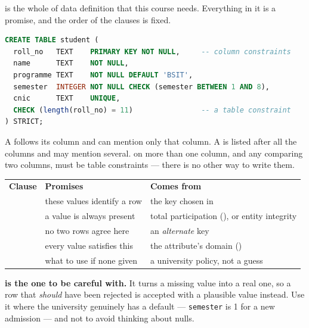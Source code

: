  is the whole of data definition that this course needs.
Everything in it is a promise, and the order of the clauses is fixed.

\begin{definitionbox}
\begin{lstlisting}[language=sql]
CREATE TABLE student (
  roll_no   TEXT    PRIMARY KEY NOT NULL,     -- column constraints
  name      TEXT    NOT NULL,
  programme TEXT    NOT NULL DEFAULT 'BSIT',
  semester  INTEGER NOT NULL CHECK (semester BETWEEN 1 AND 8),
  cnic      TEXT    UNIQUE,
  CHECK (length(roll_no) = 11)                -- a table constraint
) STRICT;
\end{lstlisting}

\smallskip
A  follows its column and can mention only that
column. A  is listed after all the columns and may
mention several.  on more than one column, and any
 comparing two columns, must be table constraints --- there is no
other way to write them.
\end{definitionbox}

\begin{examplebox}
\begin{tabular}{@{}L{3.0cm}L{4.5cm}L{6.5cm}@{}}
\textbf{Clause} & \textbf{Promises} & \textbf{Comes from} \\
 & these values identify a row & the key chosen in
   \\
 & a value is always present & total participation
  (), or entity integrity \\
 & no two rows agree here & an \emph{alternate} key \\
 & every value satisfies this & the attribute's domain
  () \\
 & what to use if none given & a university policy, not a
  guess \\
\end{tabular}

\smallskip
\textbf{ is the one to be careful with.} It turns a missing
value into a real one, so a row that \emph{should} have been rejected is
accepted with a plausible value instead. Use it where the university genuinely
has a default --- \texttt{semester} is 1 for a new admission --- and not to
avoid thinking about nulls.
\end{examplebox}

